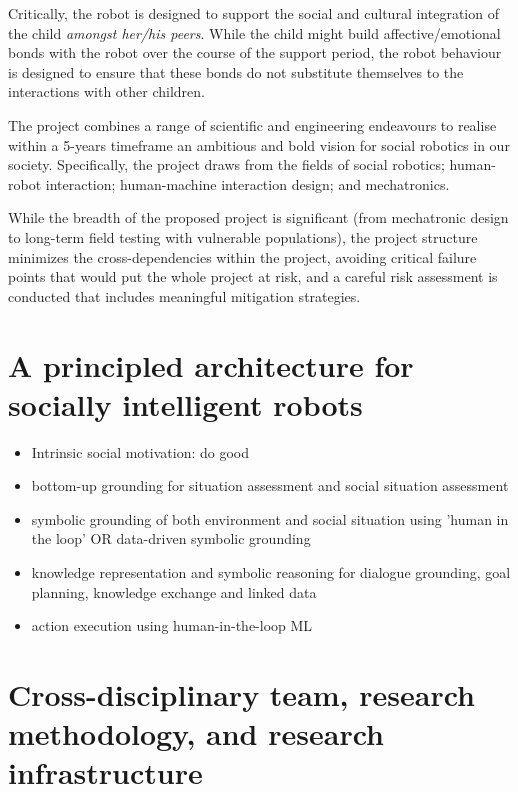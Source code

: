 \documentclass[11pt]{report}
\begin{document}
Critically, the robot is designed to support the social and cultural
integration of the child \emph{amongst her/his peers}. While the child
might build affective/emotional bonds with the robot over the course of
the support period, the robot behaviour is designed to ensure that these
bonds do not substitute themselves to the interactions with other
children.

The project combines a range of scientific and engineering endeavours to
realise within a 5-years timeframe an ambitious and bold vision for
social robotics in our society. Specifically, the project draws from the
fields of social robotics; human-robot interaction; human-machine
interaction design; and mechatronics.

While the breadth of the proposed project is significant (from
mechatronic design to long-term field testing with vulnerable
populations), the project structure minimizes the cross-dependencies
within the project, avoiding critical failure points that would put the
whole project at risk, and a careful risk assessment is conducted that
includes meaningful mitigation strategies.




\section{A principled architecture for socially intelligent robots}


\begin{itemize}
    \item Intrinsic social motivation: do good
    \item bottom-up grounding for situation assessment and social situation
        assessment
    \item symbolic grounding of both environment and social situation using
        'human in the loop' OR data-driven symbolic grounding
    \item knowledge representation and symbolic reasoning for dialogue
        grounding, goal planning, knowledge exchange and linked data
    \item action execution using human-in-the-loop ML
\end{itemize}


\section{Cross-disciplinary team, research methodology, and research
infrastructure}
\end{document}
